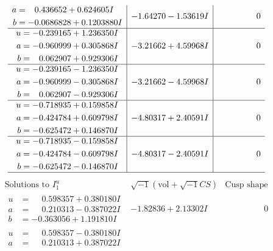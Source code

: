 \documentclass[1p]{elsarticle_modified}
\theoremstyle{definition}
\newcommand{\I}{\sqrt{-1}}
\begin{document}
$$\begin{array}{c|c|c}
\begin{aligned}
a &= \phantom{-}0.436652 + 0.624605 I \\
b &= -0.0686828 + 0.1203880 I\end{aligned}
 & -1.64270 - 1.53619 I & \phantom{-0.000000 } 0 \\ \hline\begin{aligned}
u &= -0.239165 + 1.236350 I \\
a &= -0.960999 + 0.305868 I \\
b &= \phantom{-}0.062907 + 0.929306 I\end{aligned}
 & -3.21662 + 4.59968 I & \phantom{-0.000000 } 0 \\ \hline\begin{aligned}
u &= -0.239165 - 1.236350 I \\
a &= -0.960999 - 0.305868 I \\
b &= \phantom{-}0.062907 - 0.929306 I\end{aligned}
 & -3.21662 - 4.59968 I & \phantom{-0.000000 } 0 \\ \hline\begin{aligned}
u &= -0.718935 + 0.159858 I \\
a &= -0.424784 + 0.609798 I \\
b &= -0.625472 + 0.146870 I\end{aligned}
 & -4.80317 + 2.40591 I & \phantom{-0.000000 } 0 \\ \hline\begin{aligned}
u &= -0.718935 - 0.159858 I \\
a &= -0.424784 - 0.609798 I \\
b &= -0.625472 - 0.146870 I\end{aligned}
 & -4.80317 - 2.40591 I & \phantom{-0.000000 } 0\\
 \hline 
 \end{array}$$\newpage$$\begin{array}{c|c|c}  
\text{Solutions to }I^u_{1}& \I (\text{vol} + \sqrt{-1}CS) & \text{Cusp shape}\\
 \hline 
\begin{aligned}
u &= \phantom{-}0.598357 + 0.380180 I \\
a &= \phantom{-}0.210313 - 0.387022 I \\
b &= -0.363056 + 1.191810 I\end{aligned}
 & -1.82836 + 2.13302 I & \phantom{-0.000000 } 0 \\ \hline\begin{aligned}
u &= \phantom{-}0.598357 - 0.380180 I \\
a &= \phantom{-}0.210313 + 0.387022 I \\

\end{aligned}
\end{array}$$
\end{document}
